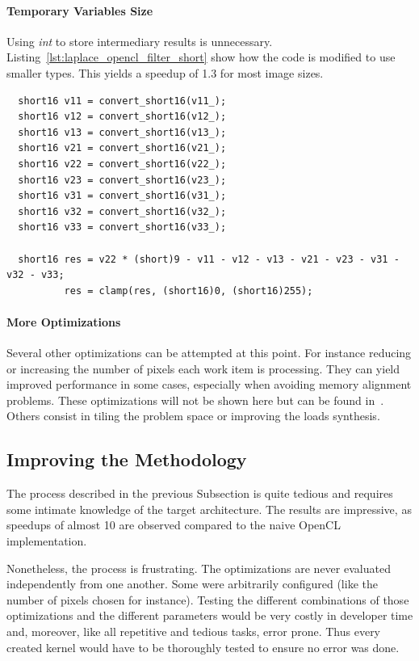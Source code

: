 \documentclass{IEEEtran}
\begin{document}
\paragraph{Temporary Variables Size} Using \emph{int} to store intermediary
results is unnecessary. Listing~\ref{lst:laplace_opencl_filter_short} show how
the code is modified to use smaller types. This yields a speedup of 1.3 for
most image sizes.

\begin{lstlisting}
  short16 v11 = convert_short16(v11_);
  short16 v12 = convert_short16(v12_);
  short16 v13 = convert_short16(v13_);
  short16 v21 = convert_short16(v21_);
  short16 v22 = convert_short16(v22_);
  short16 v23 = convert_short16(v23_);
  short16 v31 = convert_short16(v31_);
  short16 v32 = convert_short16(v32_);
  short16 v33 = convert_short16(v33_);

  short16 res = v22 * (short)9 - v11 - v12 - v13 - v21 - v23 - v31 - v32 - v33;
          res = clamp(res, (short16)0, (short16)255);
\end{lstlisting}

\paragraph{More Optimizations} Several other optimizations can be attempted at
this point. For instance reducing or increasing the number of pixels each work
item is processing. They can yield improved performance in some cases,
especially when avoiding memory alignment problems. These optimizations will
not be shown here but can be found in~\cite{opencl_arm_training}. Others
consist in tiling the problem space or improving the loads synthesis.

\subsection{Improving the Methodology}

The process described in the previous Subsection is quite tedious and requires
some intimate knowledge of the target architecture. The results are impressive,
as speedups of almost 10 are observed compared to the naive OpenCL
implementation.

Nonetheless, the process is frustrating. The optimizations are never evaluated
independently from one another. Some were arbitrarily configured (like the
number of pixels chosen for instance). Testing the different combinations of
those optimizations and the different parameters would be very costly in
developer time and, moreover, like all repetitive and tedious tasks, error
prone. Thus every created kernel would have to be thoroughly tested to ensure
no error was done.
\end{document}
